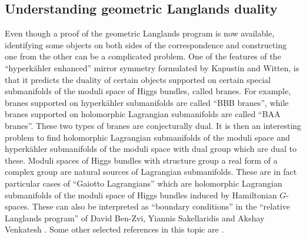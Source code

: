 \documentclass[12pt,a4paper]{amsbook}
\theoremstyle{remark} \newtheorem{rmk}[thm]{Remark}
\theoremstyle{definition} \newtheorem{defn}[thm]{Definition}
\theoremstyle{definition} \newtheorem{ex}[thm]{Example}
\theoremstyle{definition} \newtheorem{ej}{Exercise}
\begin{document}
\subsection*{Understanding geometric Langlands duality} Even though a proof of the geometric Langlands program is now available, identifying some objects on both sides of the correspondence and constructing one from the other can be a complicated problem. One of the features of the ``hyperkähler enhanced'' mirror symmetry formulated by Kapustin and Witten, is that it predicts the duality of certain objects supported on certain special submanifolds of the moduli space of Higgs bundles, called branes. For example, branes supported on hyperkähler submanifolds are called ``BBB branes'', while branes supported on holomorphic Lagrangian submanifolds are called ``BAA branes''. These two types of branes are conjecturally dual. It is then an interesting problem to find holomorphic Lagrangian submanifolds of the moduli space and hyperkähler submanifolds of the moduli space with dual group which are dual to these. Moduli spaces of Higgs bundles with structure group a real form of a complex group are natural sources of Lagrangian submanifolds. These are in fact particular cases of ``Gaiotto Lagrangians'' \cite{Gaiotto,GinzburgRozenblyum} which are holomorphic Lagrangian submanifolds of the moduli space of Higgs bundles induced by Hamiltonian $G$-spaces. These can also be interpreted as ``boundary conditions'' in the ``relative Langlands program'' of David Ben-Zvi, Yiannis Sakellaridis and Akshay Venkatesh \cite{BZSV}. Some other selected references in this topic are \cite{BaragliaSchaposnik,HellerSchaposnik,BiswasOscarJacques,HauselEnhanced,FGOP,FrancoHanson,HameisterLuoMorrissey,ChenHsiaoYang}.
\end{document}
